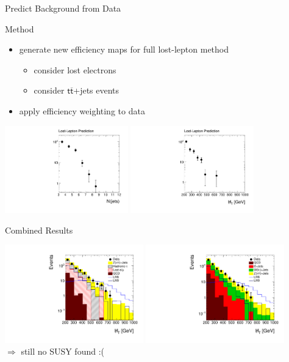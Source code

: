 \begin{frame}{Predict Background from Data}

\begin{block}{Method}
\begin{itemize}
\item generate new efficiency maps for full lost-lepton method
\begin{itemize}
	\item consider lost electrons
	\item consider $\mathsf{t\overline{t}}$+jets events
\end{itemize}
\item apply efficiency weighting to data
\end{itemize}
\end{block} 

\begin{center}
\includegraphics[width = 0.4\textwidth]{plots11/LLPredictionNJets.pdf}
\includegraphics[width = 0.4\textwidth]{plots11/LLPredictionMHT.pdf}
\end{center}

\end{frame}



\begin{frame}{Combined Results}

\includegraphics[width = 0.45\textwidth]{plots11/hDataVsBkg_Mht.pdf}
\includegraphics[width = 0.45\textwidth]{plots11/hDataVsMC_Mht.pdf}\\
$\Rightarrow$ still no SUSY found :(
\end{frame} 
